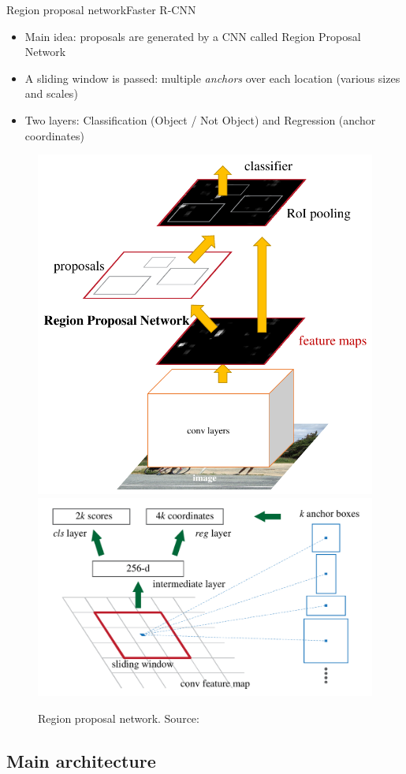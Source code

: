 \documentclass[8pt,t,aspectratio=1610]{beamer}
\newcommand{\ratio}{0.5}
\begin{document}
\begin{frame}{Region proposal network}{Faster R-CNN}
\begin{itemize}
    \item Main idea: proposals are generated by a CNN called Region Proposal Network
    \pause
    \item A sliding window is passed: multiple \emph{anchors} over each location (various sizes and scales)
    \item Two layers: Classification (Object / Not Object) and Regression (anchor coordinates)
\end{itemize}
    
\renewcommand{\ratio}{0.45}
\centering
\begin{figure}
    \includegraphics[width=0.4\linewidth]{faster_rnn_wholenetwork.png}
    \includegraphics[width=0.55\linewidth]{faster_rnn_rpn.png}
    \caption{Region proposal network. Source: \cite{ren2015faster}}
\end{figure}

\end{frame}

\subsection{Main architecture}

\end{document}
